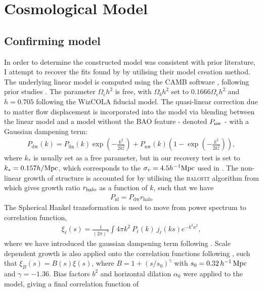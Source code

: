 \documentclass[titlesmallcaps, examinerscopy, copyrightpage]{uqthesis}
\begin{document}
\chapter{Cosmological Model}
\label{ch:model}

\section{Confirming model}

In order to determine the constructed model was consistent with prior literature, I attempt to recover the fits found by \citet{BlakeKazin2011} by utilising their model creation method. The underlying linear model is computed using the CAMB software \citep{Lewis2000}, following prior studies \citep{BlakeDavis2011, SanchezScoccola2012, ChuangWang2012}. The parameter $\Omega_c h^2$ is free, with $\Omega_b h^2$ set to $0.1666\Omega_c h^2$ and $h=0.705$ following the WizCOLA fiducial model. The quasi-linear correction due to matter flow displacement is incorporated into the model via blending between the linear model and a model without the BAO feature - denoted $P_{\rm{nw}}$ - with a Gaussian dampening term:
\begin{align}
P_{\text{dw}}(k) = P_{\text{lin}}(k) \exp\left(-\frac{k^2}{2k_*^2}\right)  + P_{\text{nw}}(k) \left(1 - \exp\left(-\frac{k^2}{2k_*^2}\right)\right),
\end{align}
where $k_*$ is usually set as a free parameter, but in our recovery test is set to $k_*=0.157 h\rm{/Mpc}$, which corresponds to the $\sigma_v = 4.5h^{-1} \rm{Mpc}$ used in \citet{BlakeDavis2011}. The non-linear growth of structure is accounted for by utilising the \textsc{halofit} algorithm from \citet{Smith2003} which gives growth ratio $r_{\rm{halo}}$ as a function of $k$, such that we have
\begin{align}
P_{\text{nl}} = P_{\text{dw}} r_{\text{halo}}
\end{align}
The Spherical Hankel transformation is used to move from power spectrum to correlation function,
\begin{align}
\xi_\ell(s) = \frac{1}{(2\pi)^3} \int 4\pi k^2 \ P_\ell(k) \ j_\ell(ks) e^{-k^2 a^2},
\end{align}
where we have introduced the gaussian dampening term following \citet{AndersonAubourg2012}. Scale dependent growth is also applied onto the correlation functions following \citet{BlakeDavis2011}, such that $\xi_B(s) = B(s) \xi(s)$, where $B = 1 + (s/s_0)^\gamma$ with $s_0 = 0.32\, h^{-1}\,\rm{Mpc}$ and $\gamma = -1.36$. Bias factors $b^2$ and horizontal dilation $\alpha_0$ were applied to the model, giving a final correlation function of 
\end{document}
